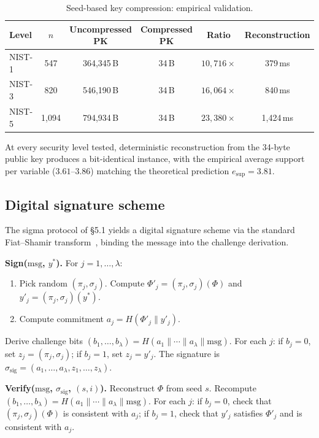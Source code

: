\documentclass[11pt]{article}
\begin{document}
\begin{table}[ht]
\centering
\caption{Seed-based key compression: empirical validation.}\label{tab:compress}
\begin{tabular}{@{}lccccc@{}}
\toprule
Level & $n$ & Uncompressed PK & Compressed PK & Ratio & Reconstruction \\
\midrule
NIST-1 & 547 & 364{,}345\,B & 34\,B & $10{,}716\times$ & 379\,ms \\
NIST-3 & 820 & 546{,}190\,B & 34\,B & $16{,}064\times$ & 840\,ms \\
NIST-5 & 1{,}094 & 794{,}934\,B & 34\,B & $23{,}380\times$ & 1{,}424\,ms \\
\bottomrule
\end{tabular}
\end{table}

At every security level tested, deterministic reconstruction from the 34-byte public key produces a bit-identical instance, with the empirical average support per variable ($3.61$--$3.86$) matching the theoretical prediction $e_{\mathrm{sup}} = 3.81$.


\subsection{Digital signature scheme}\label{sec:sig}

The sigma protocol of \S5.1 yields a digital signature scheme via the standard Fiat--Shamir transform~\cite{FS86}, binding the message into the challenge derivation.

\medskip\noindent\textbf{Sign($\mathrm{msg}$, $y^*$).}  For $j = 1, \ldots, \lambda$:
\begin{enumerate}
\item Pick random $(\pi_j, \sigma_j)$.  Compute $\Phi'_j = (\pi_j, \sigma_j)(\Phi)$ and $y'_j = (\pi_j, \sigma_j)(y^*)$.
\item Compute commitment $a_j = H(\Phi'_j \| y'_j)$.
\end{enumerate}
Derive challenge bits $(b_1, \ldots, b_\lambda) = H(a_1 \| \cdots \| a_\lambda \| \mathrm{msg})$.  For each $j$: if $b_j = 0$, set $z_j = (\pi_j, \sigma_j)$; if $b_j = 1$, set $z_j = y'_j$.  The signature is $\sigma_{\mathrm{sig}} = (a_1, \ldots, a_\lambda, z_1, \ldots, z_\lambda)$.

\medskip\noindent\textbf{Verify($\mathrm{msg}$, $\sigma_{\mathrm{sig}}$, $(s, i)$).}  Reconstruct $\Phi$ from seed $s$.  Recompute $(b_1, \ldots, b_\lambda) = H(a_1 \| \cdots \| a_\lambda \| \mathrm{msg})$.  For each $j$: if $b_j = 0$, check that $(\pi_j, \sigma_j)(\Phi)$ is consistent with $a_j$; if $b_j = 1$, check that $y'_j$ satisfies $\Phi'_j$ and is consistent with $a_j$.
\end{document}
